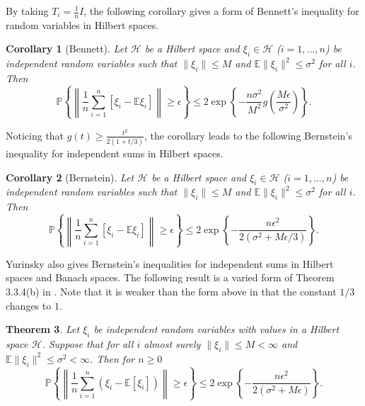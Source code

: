 \documentclass[twoside]{amsart}
\theoremstyle{theorem}
\newtheorem{thm}{Theorem}[section]
\newtheorem{cor}[thm]{Corollary}
\theoremstyle{definition}
\theoremstyle{remark}
\def\H{{\mathscr H}}
\newcommand{\DS}{\displaystyle}
\def\P{{\mathbb P}}        %
\def\E{{\mathbb E}}        %
\begin{document}
By taking $\DS T_i=\frac{1}{n} I$, the following corollary gives a
form of Bennett's inequality for random variables in Hilbert
spaces.
\begin{cor}[Bennett]
Let $\H$ be a Hilbert space and $\xi_i\in \H$ ($i=1,\ldots,n$) be independent random variables such that $\|\xi_i\|\leq M$ and
$\E\|\xi_i\|^2 \leq \sigma^2$ for all $i$.
Then
\[ \P \left\{ \left\|\frac{1}{n}\sum_{i=1}^n [\xi_i-\E \xi_i] \right\| \geq \epsilon \right\} \leq
2 \exp \left\{- \frac{n\sigma^2}{M^2} g \left(\frac{M\epsilon}{\sigma^2}\right)\right\}. \]
\end{cor}
Noticing that $\DS g(t)\geq \frac{t^2}{2(1+t/3)}$, the corollary leads to the following Bernstein's inequality for independent sums in
Hilbert spaces.
\begin{cor}[Bernstein]
Let $\H$ be a Hilbert space and $\xi_i\in \H$ ($i=1,\ldots,n$) be independent random variables such that $\|\xi_i\|\leq M$ and
$\E\|\xi_i\|^2 \leq \sigma^2$ for all $i$.
Then
\[ \P \left\{ \left\|\frac{1}{n}\sum_{i=1}^n [\xi_i-\E \xi_i] \right\| \geq \epsilon \right\} \leq
2 \exp \left\{- \frac{n\epsilon^2}{2(\sigma^2+M\epsilon/3)} \right\}. \]
\end{cor}
Yurinsky \cite{Yurinsky95} also gives Bernstein's inequalities for independent
sums in Hilbert spaces and Banach spaces. The
following result is a varied form of Theorem 3.3.4(b) in
\cite{Yurinsky95}. Note that it is weaker than the form above in that the constant $1/3$ changes to
$1$.

\begin{thm}
Let $\xi_i$ be independent random variables with values in a
Hilbert space $\H$. Suppose that for all $i$ almost surely
$\|\xi_i\|\leq M<\infty$ and $\E\|\xi_i\|^2\leq \sigma^2 <\infty$.
Then for $n\geq 0$
\[ \P \left\{ \left\|\frac{1}{n}\sum_{i=1}^n (\xi_i-\E[\xi_i]) \right\| \geq \epsilon \right\}
\leq 2 \exp \left\{- \frac{n\epsilon^2}{2(\sigma^2+ M\epsilon)}
\right\}.\]
\end{thm}



%
\end{document}
